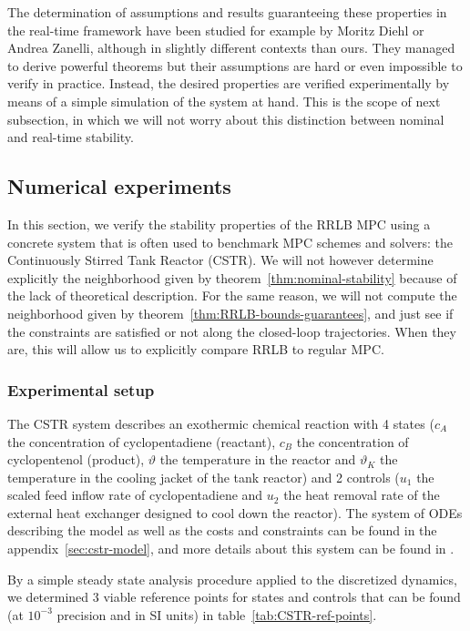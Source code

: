 \documentclass[12pt]{article}
\begin{document}
The determination of assumptions and results guaranteeing these properties in the real-time framework have been studied for example by Moritz Diehl or Andrea Zanelli, although in slightly different contexts than ours.
They managed to derive powerful theorems but their assumptions are hard or even impossible to verify in practice.
Instead, the desired properties are verified experimentally by means of a simple simulation of the system at hand.
This is the scope of next subsection, in which we will not worry about this distinction between nominal and real-time stability.


\subsection{Numerical experiments}\label{sec:RRLB-numerical-experiments}

In this section, we verify the stability properties of the RRLB MPC using a concrete system that is often used to benchmark MPC schemes and solvers: the Continuously Stirred Tank Reactor (CSTR).
We will not however determine explicitly the neighborhood given by theorem~\ref{thm:nominal-stability} because of the lack of theoretical description.
For the same reason, we will not compute the neighborhood given by theorem~\ref{thm:RRLB-bounds-guarantees}, and just see if the constraints are satisfied or not along the closed-loop trajectories.
When they are, this will allow us to explicitly compare RRLB to regular MPC.

\subsubsection{Experimental setup}

The CSTR system describes an exothermic chemical reaction with 4 states ($c_A$ the concentration of cyclopentadiene (reactant), $c_B$ the concentration of cyclopentenol (product), $\vartheta$ the temperature in the reactor and $\vartheta_K$ the temperature in the cooling jacket of the tank reactor) and 2 controls ($u_1$ the scaled feed inflow rate of cyclopentadiene and $u_2$ the heat removal rate of the external heat exchanger designed to cool down the reactor).
The system of ODEs describing the model as well as the costs and constraints can be found in the appendix~\ref{sec:cstr-model}, and more details about this system can be found in \cite{diehl-dissertation}.

By a simple steady state analysis procedure applied to the discretized dynamics, we determined 3 viable reference points for states and controls that can be found (at $10^{-3}$ precision and in SI units) in table~\ref{tab:CSTR-ref-points}.
\end{document}
